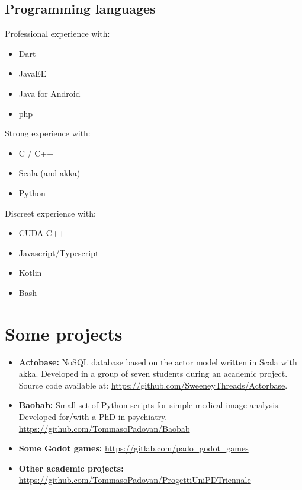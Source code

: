 \documentclass[letterpaper]{twentysecondcv} %
\begin{document}
\subsection{Programming languages}
\begin{minipage}[t]{0.33\linewidth}
	\small
	Professional experience with:
	\begin{itemize}[noitemsep]
		\item Dart
		\item JavaEE
		\item Java for Android
		\item php
	\end{itemize}
\end{minipage}
\begin{minipage}[t]{0.33\linewidth}
	\small
	Strong experience with:
	\begin{itemize}[noitemsep]
		\item C / C++
		\item Scala (and akka)
		\item Python
	\end{itemize}
\end{minipage}
\begin{minipage}[t]{0.33\linewidth}
	\small
	Discreet experience with:
	\begin{itemize}[noitemsep,nolistsep]
		\item CUDA C++
		\item Javascript/Typescript
		\item Kotlin
		\item Bash
	\end{itemize}
\end{minipage}





\section{Some projects}
\small
\begin{itemize}[noitemsep,nolistsep]
	\item \textbf{Actobase:} NoSQL database based on the actor model written in Scala with akka. Developed in a group of seven students during an academic project. Source code available at: \url{https://github.com/SweeneyThreads/Actorbase}.
	\item \textbf{Baobab:} Small set of Python scripts for simple medical image analysis. Developed for/with a PhD in psychiatry. \url{https://github.com/TommasoPadovan/Baobab}
	\item \textbf{Some Godot games:} \url{https://gitlab.com/pado_godot_games}
	\item \textbf{Other academic projects:} \\\url{https://github.com/TommasoPadovan/ProgettiUniPDTriennale}
\end{itemize}
\end{document}
